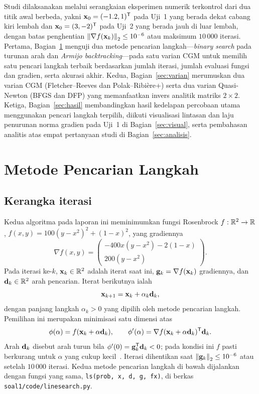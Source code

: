 \documentclass[12pt,a4paper]{article}
\begin{document}
Studi dilaksanakan melalui serangkaian eksperimen numerik terkontrol dari dua titik awal berbeda, yakni
$\mathbf{x}_0=(-1.2,1)^{\mathsf{T}}$ pada Uji~1 yang berada dekat cabang kiri lembah dan $\mathbf{x}_0=(3,-2)^{\mathsf{T}}$ pada Uji~2 yang berada jauh
di luar lembah, dengan batas penghentian $\left\lVert \nabla f(\mathbf{x}_k)\right\rVert_2\le10^{-6}$ atau maksimum $10\,000$ iterasi. Pertama,
Bagian~\ref{sec:linesearch} menguji dua metode pencarian langkah---\emph{binary search} pada turunan arah dan
\emph{Armijo backtracking}---pada satu varian CGM untuk memilih satu pencari langkah terbaik berdasarkan jumlah
iterasi, jumlah evaluasi fungsi dan gradien, serta akurasi akhir. Kedua, Bagian~\ref{sec:varian} merumuskan dua varian
CGM (Fletcher--Reeves dan Polak--Ribi\`ere+) serta dua varian Quasi-Newton (BFGS dan DFP) yang memanfaatkan invers
analitik matriks $2\times2$. Ketiga, Bagian~\ref{sec:hasil} membandingkan hasil kedelapan percobaan utama menggunakan
pencari langkah terpilih, diikuti visualisasi lintasan dan laju penurunan norma gradien pada Uji~1 di
Bagian~\ref{sec:visual}, serta pembahasan analitis atas empat pertanyaan studi di Bagian~\ref{sec:analisis}.

\section{Metode Pencarian Langkah}\label{sec:linesearch}

\subsection{Kerangka iterasi}
Kedua algoritma pada laporan ini meminimumkan fungsi Rosenbrock $f:\mathbb{R}^2\to\mathbb{R}$,
$f(x,y)=100(y-x^2)^2+(1-x)^2$, yang gradiennya
\begin{equation}\label{eq:grad}
\nabla f(x,y)=\begin{pmatrix}-400x(y-x^2)-2(1-x)\\ 200(y-x^2)\end{pmatrix}.
\end{equation}
Pada iterasi ke-$k$, $\mathbf{x}_k\in\mathbb{R}^2$ adalah iterat saat ini, $\mathbf{g}_k=\nabla f(\mathbf{x}_k)$ gradiennya, dan
$\mathbf{d}_k\in\mathbb{R}^2$ arah pencarian. Iterat berikutnya ialah
\begin{equation}\label{eq:update}
\mathbf{x}_{k+1}=\mathbf{x}_k+\alpha_k\mathbf{d}_k,
\end{equation}
dengan panjang langkah $\alpha_k>0$ yang dipilih oleh metode pencarian langkah. Pemilihan ini merupakan
minimisasi satu dimensi atas
\[
\phi(\alpha)=f(\mathbf{x}_k+\alpha\mathbf{d}_k),\qquad \phi'(\alpha)=\nabla f(\mathbf{x}_k+\alpha\mathbf{d}_k)^{\mathsf{T}}\mathbf{d}_k .
\]
Arah $\mathbf{d}_k$ disebut arah turun bila $\phi'(0)=\mathbf{g}_k^{\mathsf{T}}\mathbf{d}_k<0$; pada kondisi ini $f$ pasti berkurang untuk
$\alpha$ yang cukup kecil~\cite{nocedal}. Iterasi dihentikan saat $\left\lVert \mathbf{g}_k\right\rVert_2\le10^{-6}$ atau setelah
$10\,000$ iterasi. Kedua metode pencarian langkah di bawah dijalankan dengan fungsi yang sama,
\texttt{ls(prob, x, d, g, fx)}, di berkas \texttt{soal1/code/linesearch.py}.
\end{document}

